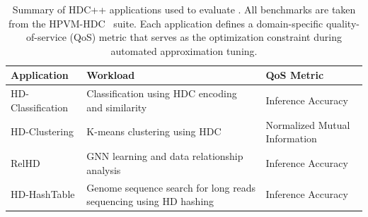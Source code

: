 \begin{table}[t]
  \centering
  \small
  \caption{Summary of HDC++ applications used to evaluate \pname{}. All benchmarks are taken from the HPVM-HDC~\cite{hpvm-hdc} suite. Each application defines a domain-specific quality-of-service (QoS) metric that serves as the optimization constraint during automated approximation tuning.}
  \vspace{-0.1 in}
  \label{tab:HDC-workloads}
  \begin{tabular}{@{}lll@{}}
    \toprule
    \textbf{Application} & \textbf{Workload} & \textbf{QoS Metric} \\
    \midrule
    HD-Classification \cite{HD2FPGA}           & Classification using HDC encoding and similarity & Inference Accuracy            \\
    HD-Clustering \cite{HD2FPGA, hdclustering}  & K-means clustering using HDC                     & Normalized Mutual Information  \\
    RelHD \cite{relhd}                          & GNN learning and data relationship analysis           &   Inference Accuracy\\
    HD-HashTable \cite{biohd}                   & Genome sequence search for long reads
sequencing  using HD hashing           &   Inference Accuracy              \\
    \bottomrule
  \end{tabular}
\end{table}